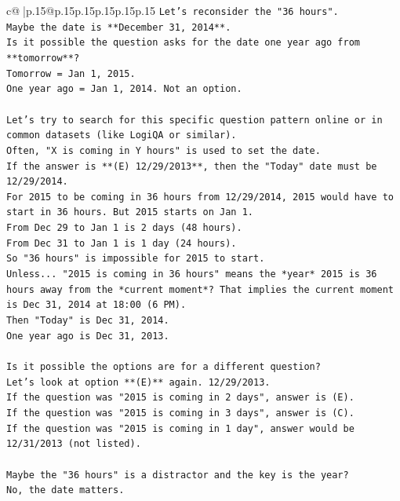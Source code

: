 \documentclass{article}
\begin{document}
{\begin{supertabular}{c@{$\;$}|p{.15\linewidth}@{}p{.15\linewidth}p{.15\linewidth}p{.15\linewidth}p{.15\linewidth}p{.15\linewidth}}
{{{\texttt{Let's reconsider the "36 hours".} \\
\texttt{Maybe the date is **December 31, 2014**.} \\
\texttt{Is it possible the question asks for the date one year ago from **tomorrow**?} \\
\texttt{Tomorrow = Jan 1, 2015.} \\
\texttt{One year ago = Jan 1, 2014. Not an option.} \\
\\ 
\texttt{Let's try to search for this specific question pattern online or in common datasets (like LogiQA or similar).} \\
\texttt{Often, "X is coming in Y hours" is used to set the date.} \\
\texttt{If the answer is **(E) 12/29/2013**, then the "Today" date must be 12/29/2014.} \\
\texttt{For 2015 to be coming in 36 hours from 12/29/2014, 2015 would have to start in 36 hours. But 2015 starts on Jan 1.} \\
\texttt{From Dec 29 to Jan 1 is 2 days (48 hours).} \\
\texttt{From Dec 31 to Jan 1 is 1 day (24 hours).} \\
\texttt{So "36 hours" is impossible for 2015 to start.} \\
\texttt{Unless... "2015 is coming in 36 hours" means the *year* 2015 is 36 hours away from the *current moment*? That implies the current moment is Dec 31, 2014 at 18:00 (6 PM).} \\
\texttt{Then "Today" is Dec 31, 2014.} \\
\texttt{One year ago is Dec 31, 2013.} \\
\\ 
\texttt{Is it possible the options are for a different question?} \\
\texttt{Let's look at option **(E)** again. 12/29/2013.} \\
\texttt{If the question was "2015 is coming in 2 days", answer is (E).} \\
\texttt{If the question was "2015 is coming in 3 days", answer is (C).} \\
\texttt{If the question was "2015 is coming in 1 day", answer would be 12/31/2013 (not listed).} \\
\\ 
\texttt{Maybe the "36 hours" is a distractor and the key is the year?} \\
\texttt{No, the date matters.} \\
}}}
\end{supertabular}}
\end{document}
